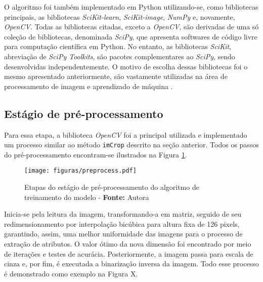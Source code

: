 O algoritmo foi também implementado em Python utilizando-se, como bibliotecas principais, as bibliotecas \textit{SciKit-learn}, \textit{SciKit-image}, \textit{NumPy} e, novamente, \textit{OpenCV}. Todas as bibliotecas citadas, exceto a \textit{OpenCV}, são derivadas de uma só coleção de bibliotecas, denominada \textit{SciPy}, que apresenta softwares de código livre para computação científica em Python. No entanto, as bibliotecas \textit{SciKit}, abreviação de \textit{SciPy Toolkits}, são pacotes complementares ao \textit{SciPy}, sendo desenvolvidas independentemente. O motivo de escolha dessas bibliotecas foi o mesmo apresentado anteriormente, são vastamente utilizadas na área de processamento de imagem e aprendizado de máquina     .

\subsection{Estágio de pré-processamento}

Para essa etapa, a biblioteca \textit{OpenCV} foi a principal utilizada e implementado um processo similar ao método \texttt{imCrop} descrito na seção anterior. Todos os passos do pré-processamento encontram-se ilustrados na Figura \ref{fig:flowpreProc}.

\begin{figure}[H]
  \centering
  \texttt{[image: figuras/preprocess.pdf]}
  \caption{Etapas do estágio de pré-processamento do algoritmo de treinamento do modelo - \textbf{Fonte:} Autora}
  \label{fig:flowpreProc}
\end{figure}

Inicia-se pela leitura da imagem, transformando-a em matriz, seguido de seu redimensionamento por interpolação bicúbica para altura fixa de 126 pixels, garantindo, assim, uma melhor uniformidade das imagens para o processo de extração de atributos. O valor ótimo da nova dimensão foi encontrado por meio de iterações e testes de acurácia. Posteriormente, a imagem passa para escala de cinza e, por fim, é executada a binarização inversa da imagem. Todo esse processo é demonstrado como exemplo na Figura X.


